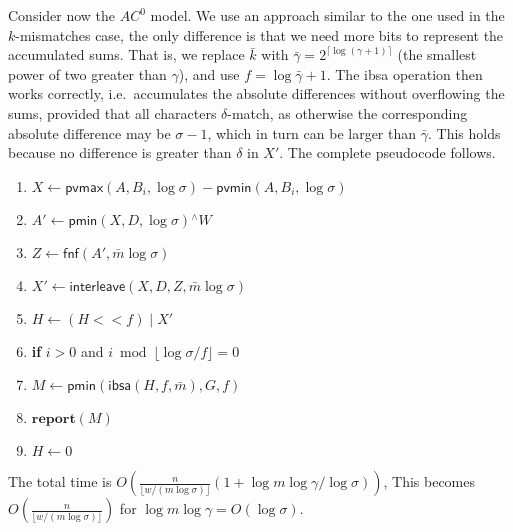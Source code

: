 \documentclass{llncs}
\newcommand{\ceil}[1]{\lceil #1 \rceil}
\newcommand{\floor}[1]{\lfloor #1 \rfloor}
\newcommand{\uxor}{\mathrel{^\wedge}}
\newcommand{\uor}{\mathrel{|}}
\newcommand{\fsize}{f}
\newcommand{\word}[1]{#1}
\begin{document}
Consider now the $AC^0$ model. We use an approach similar to the one
used in the $k$-mismatches case, the only difference is that we need
more bits to represent the accumulated sums. That is, we replace
$\bar{k}$ with $\bar{\gamma} = 2^{\ceil{\log(\gamma+1)}}$ (the
smallest power of two greater than $\gamma$), and use $\fsize =
\log\bar{\gamma}+1$. The \textsf{ibsa} operation then works correctly,
i.e.\ accumulates the absolute differences without overflowing the
sums, provided that all characters $\delta$-match, as otherwise the
corresponding absolute difference may be $\sigma-1$, which in turn can
be larger than $\bar{\gamma}$.
This holds because no difference is greater than $\delta$ in $X'$.
The complete pseudocode follows.
\begin{enumerate}
\item $\word{X} \leftarrow \textsf{pvmax}(\word{A},\word{B_i},\log\sigma) -
\textsf{pvmin}(\word{A},\word{B_i},\log\sigma)$
\item $\word{A'} \leftarrow \textsf{pmin}(\word{X}, \word{D},\log\sigma) \uxor \word{W}$
\item $\word{Z} \leftarrow \textsf{fnf}(\word{A'}, \bar{m}\log\sigma)$
\item $\word{X'} \leftarrow \textsf{interleave}(\word{X}, \word{D}, \word{Z}, \bar{m}\log\sigma)$
\item $\word{H}\leftarrow (\word{H} << \fsize) \uor \word{X'}$
\item \textbf{if} $i > 0$ and $i\bmod \floor{\log\sigma / \fsize} = 0$
\item \qquad $M\leftarrow \textsf{pmin}(\textsf{ibsa}(\word{H}, \fsize, \bar{m}), G, \fsize)$
\item \qquad $\textbf{report}(M)$
\item \qquad $\word{H}\leftarrow 0$
\end{enumerate}
The total time is $O(\frac{n}{\floor{w/(m\log\sigma)}} (1+\log m \log\gamma / \log\sigma))$,
This becomes $O(\frac{n}{\floor{w/(m\log\sigma)}})$ for $\log m\log\gamma = O(\log\sigma)$.
\end{document}
